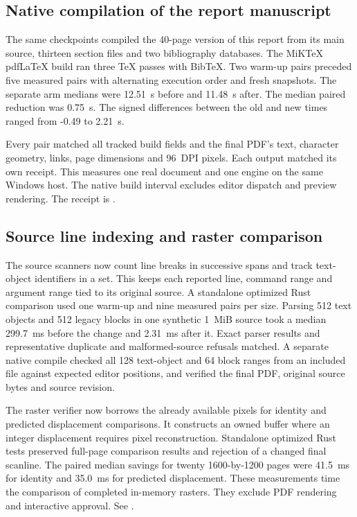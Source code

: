 \subsection{Native compilation of the report manuscript}

The same checkpoints compiled the 40-page version of this report from
its main source, thirteen section files and two bibliography databases.
The MiK\TeX{} pdf\LaTeX{} build ran three TeX passes with BibTeX. Two
warm-up pairs preceded five measured pairs with alternating execution
order and fresh snapshots. The separate arm medians were
12.51~s before and 11.48~s after. The median
paired reduction was 0.75~s. The signed
differences between the old and new times ranged from
-0.49 to 2.21~s.

Every pair matched all tracked build fields and the final PDF's text,
character geometry, links, page dimensions and 96~DPI pixels. Each
output matched its own receipt. This measures one real document and one
engine on the same Windows host. The native build interval excludes
editor dispatch and preview rendering. The receipt is
.

\subsection{Source line indexing and raster comparison}

The source scanners now count line breaks in successive spans and track
text-object identifiers in a set. This keeps each reported line, command
range and argument range tied to its original source. A standalone
optimized Rust comparison used one warm-up and nine measured pairs per
size. Parsing 512 text objects and 512 legacy blocks in one synthetic
1~MiB source took a median 299.7~ms before the change and
2.31~ms after it. Exact parser results and representative
duplicate and malformed-source refusals matched. A separate native
compile checked all 128 text-object and 64 block ranges from an included
file against expected editor positions, and verified the final PDF,
original source bytes and source revision.

The raster verifier now borrows the already available pixels for
identity and predicted displacement comparisons. It constructs an owned
buffer where an integer displacement requires pixel reconstruction.
Standalone optimized Rust tests preserved full-page comparison results
and rejection of a changed final scanline. The paired median savings for
twenty 1600-by-1200 pages were 41.5~ms for identity and 35.0~ms for
predicted displacement. These measurements time the comparison of
completed in-memory rasters. They exclude PDF rendering and interactive
approval. See
.


